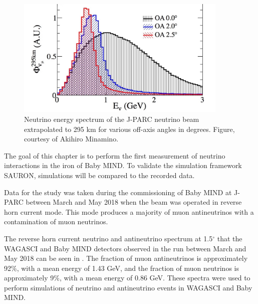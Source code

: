 \begin{figure}[h!]
\centering
\includegraphics[width=0.9\textwidth]{figures/NeutrinoChap/offAxisFlux.jpeg}
\caption{Neutrino energy spectrum of the J-PARC neutrino beam extrapolated to 295 km for various off-axis angles in degrees. Figure, courtesy of Akihiro Minamino.}
\label{fig:T2KAxis2}
\end{figure}



The goal of this chapter is to perform the first measurement of neutrino interactions in the iron of Baby MIND. To validate the simulation framework SAURON, simulations will be compared to the recorded data.

Data for the study was taken during the commissioning of Baby MIND at J-PARC between March and May 2018 when the beam was operated in reverse horn current mode. This mode produces a majority of muon antineutrinos with a contamination of muon neutrinos.

The reverse horn current neutrino and antineutrino spectrum at 1.5$^\circ$ that the WAGASCI and Baby MIND detectors observed in the run between March and May 2018 can be seen in . The fraction of muon antineutrinos is approximately 92\%, with a mean energy of 1.43 GeV, and the fraction of muon neutrinos is approximately 9\%, with a mean energy of 0.86 GeV. These spectra were used to perform simulations of neutrino and antineutrino events in WAGASCI and Baby MIND.


